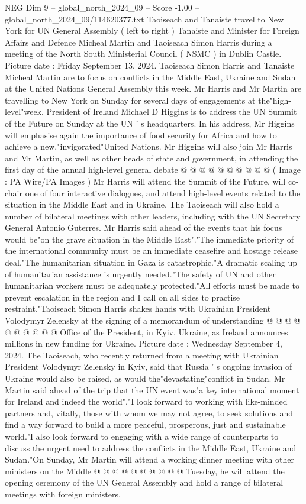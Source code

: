 \begin{textsample}{NEG Dim 9 – global\_north\_2024\_09 – Score -1.00 – global\_north\_2024\_09/114620377.txt}  \label{ex:f9_neg_215}
Taoiseach and Tanaiste travel to New York for UN General Assembly ( left to right ) Tanaiste and Minister for Foreign Affairs and Defence Micheal Martin and Taoiseach Simon Harris during a meeting of the North South Ministerial Council ( NSMC ) in Dublin Castle.
Picture date : Friday September 13, 2024.
Taoiseach Simon Harris and Tanaiste Micheal Martin are to focus on conflicts in the Middle East, Ukraine and Sudan at the United Nations General Assembly this week.
Mr Harris and Mr Martin are travelling to New York on Sunday for several days of engagements at the"high-level"week.
President of Ireland Michael D Higgins is to address the UN Summit of the Future on Sunday at the UN ' s headquarters.
In his address, Mr Higgins will emphasise again the importance of food security for Africa and how to achieve a new,"invigorated"United Nations.
Mr Higgins will also join Mr Harris and Mr Martin, as well as other heads of state and government, in attending the first day of the annual high-level general debate @ @ @ @ @ @ @ @ @ @ ( Image : PA Wire/PA Images ) Mr Harris will attend the Summit of the Future, will co-chair one of four interactive dialogues, and attend high-level events related to the situation in the Middle East and in Ukraine.
The Taoiseach will also hold a number of bilateral meetings with other leaders, including with the UN Secretary General Antonio Guterres.
Mr Harris said ahead of the events that his focus would be"on the grave situation in the Middle East"."The immediate priority of the international community must be an immediate ceasefire and hostage release deal."The humanitarian situation in Gaza is catastrophic."A dramatic scaling up of humanitarian assistance is urgently needed."The safety of UN and other humanitarian workers must be adequately protected."All efforts must be made to prevent escalation in the region and I call on all sides to practise restraint."Taoiseach Simon Harris shakes hands with Ukrainian President Volodymyr Zelensky at the signing of a memorandum of understanding @ @ @ @ @ @ @ @ @ @ Office of the President, in Kyiv, Ukraine, as Ireland announces millions in new funding for Ukraine.
Picture date : Wednesday September 4, 2024.
The Taoiseach, who recently returned from a meeting with Ukrainian President Volodymyr Zelensky in Kyiv, said that Russia ' s ongoing invasion of Ukraine would also be raised, as would the"devastating"conflict in Sudan.
Mr Martin said ahead of the trip that the UN event was"a key international moment for Ireland and indeed the world"."I look forward to working with like-minded partners and, vitally, those with whom we may not agree, to seek solutions and find a way forward to build a more peaceful, prosperous, just and sustainable world."I also look forward to engaging with a wide range of counterparts to discuss the urgent need to address the conflicts in the Middle East, Ukraine and Sudan."On Sunday, Mr Martin will attend a working dinner meeting with other ministers on the Middle @ @ @ @ @ @ @ @ @ @ Tuesday, he will attend the opening ceremony of the UN General Assembly and hold a range of bilateral meetings with foreign ministers.

\end{textsample}
